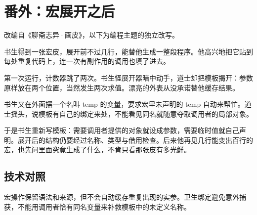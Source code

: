 \section{番外：宏展开之后}

改编自《聊斋志异·画皮》，以下为编程主题的独立改写。

书生得到一张宏皮，展开前不过几行，能替他生成一整段程序。他高兴地把它贴到每处重复代码上，连一次有副作用的调用也填了进去。

第一次运行，计数器跳了两次。书生怪展开器暗中动手，道士却把模板揭开：参数原样放在两个位置，当然发生两次求值。漂亮的外表从没承诺替他缓存结果。

书生又在外面摆一个名叫 temp 的变量，要求宏里未声明的 temp 自动来帮忙。道士摇头，说模板有自己的绑定来处，不能看见同名就随意夺取调用者的局部对象。

于是书生重新写模板：需要调用者提供的对象就设成参数，需要临时值就自己声明。展开后的结构仍要经过名称、类型与借用检查。后来他再见几行能变出百行的宏，也先问里面究竟生成了什么，不肯只看那张皮有多光鲜。

\subsection*{技术对照}

宏操作保留语法和来源，但不会自动缓存重复出现的实参。卫生绑定避免意外捕获，不能用调用者恰有同名变量来补救模板中的未定义名称。
